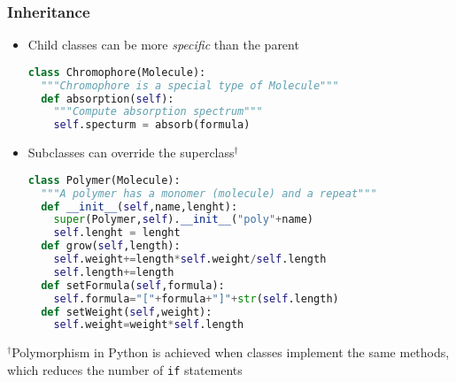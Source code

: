 \documentclass[xcolor=table,10pt,final]{beamer}
\begin{document}
\begin{frame}[fragile]
  \frametitle{Inheritance}
  \begin{itemize}
    \item Child classes can be more {\it specific} than the parent\\
      \begin{lstlisting}[language=python]
class Chromophore(Molecule):
  """Chromophore is a special type of Molecule"""
  def absorption(self):
    """Compute absorption spectrum"""
    self.specturm = absorb(formula)
      \end{lstlisting}
    \item Subclasses can override the superclass$^\dagger$\\
  \begin{lstlisting}[language=python]
class Polymer(Molecule):
  """A polymer has a monomer (molecule) and a repeat"""
  def __init__(self,name,lenght):
    super(Polymer,self).__init__("poly"+name)
    self.lenght = lenght
  def grow(self,length):
    self.weight+=length*self.weight/self.length
    self.length+=length
  def setFormula(self,formula):
    self.formula="["+formula+"]"+str(self.length)
  def setWeight(self,weight):
    self.weight=weight*self.length
  \end{lstlisting}
  \end{itemize}
  $^\dagger${\scriptsize Polymorphism in Python is achieved when classes implement the same methods, which reduces the number of {\tt if} statements}
\end{frame}
\end{document}

